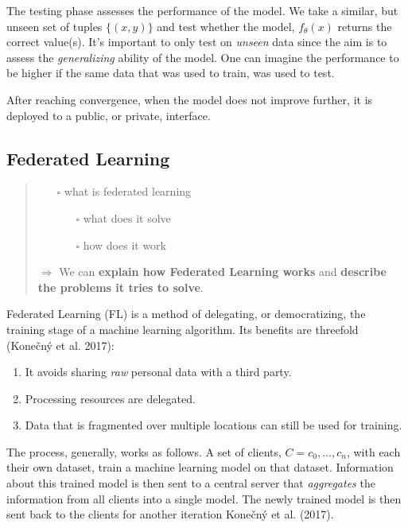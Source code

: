 The testing phase assesses the performance of the model. We take a
similar, but unseen set of tuples \(\{(x, y)\}\) and test whether the
model, \(f_\theta(x)\) returns the correct value(s). It's important to
only test on \emph{unseen} data since the aim is to assess the
\emph{generalizing} ability of the model. One can imagine the
performance to be higher if the same data that was used to train, was
used to test.

After reaching convergence, when the model does not improve further, it
is deployed to a public, or private, interface.

\hypertarget{federated-learning}{%
\subsection{Federated Learning}\label{federated-learning}}

\begin{quote}
\begin{itemize}
\tightlist
\item[$\square$]
  what is federated learning

  \begin{itemize}
  \tightlist
  \item[$\square$]
    what does it solve
  \item[$\square$]
    how does it work
  \end{itemize}
\end{itemize}

\(\Rightarrow\) We can \textbf{explain how Federated Learning works} and
\textbf{describe the problems it tries to solve}.
\end{quote}

Federated Learning (FL) is a method of delegating, or democratizing, the
training stage of a machine learning algorithm. Its benefits are
threefold (Konečný et al. 2017):

\begin{enumerate}
\def\labelenumi{\arabic{enumi}.}
\tightlist
\item
  It avoids sharing \emph{raw} personal data with a third party.
\item
  Processing resources are delegated.
\item
  Data that is fragmented over multiple locations can still be used for
  training.
\end{enumerate}

The process, generally, works as follows. A set of clients,
\(C={c_0, \ldots, c_n}\), with each their own dataset, train a machine
learning model on that dataset. Information about this trained model is
then sent to a central server that \emph{aggregates} the information
from all clients into a single model. The newly trained model is then
sent back to the clients for another iteration Konečný et al. (2017).


